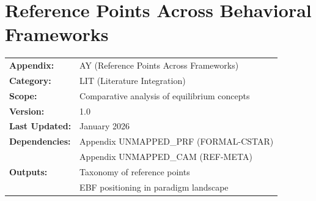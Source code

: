 \section{Reference Points Across Behavioral Frameworks}
\label{app:lit-paradigms}



\begin{tcolorbox}[colback=blue!5!white, colframe=blue!75!black,
    title=\textbf{Appendix UNMAPPED_PAP3: LIT-PARADIGMS}]

\begin{tabular}{@{}ll@{}}
\textbf{Appendix:} & AY (Reference Points Across Frameworks) \\
\textbf{Category:} & LIT (Literature Integration) \\
\textbf{Scope:} & Comparative analysis of equilibrium concepts \\
\textbf{Version:} & 1.0 \\
\textbf{Last Updated:} & January 2026 \\
\textbf{Dependencies:} & Appendix UNMAPPED_PRF (FORMAL-CSTAR) \\
                       & Appendix UNMAPPED_CAM (REF-META) \\
\textbf{Outputs:} & Taxonomy of reference points \\
                  & EBF positioning in paradigm landscape \\
\end{tabular}

\end{tcolorbox}


